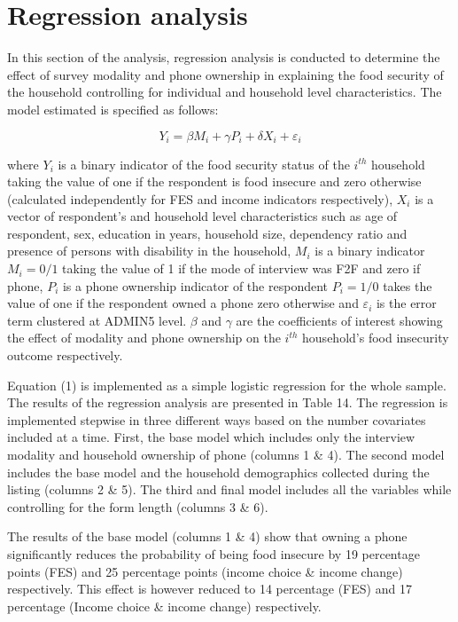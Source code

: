 \documentclass[11pt,harvard]{article}
\begin{document}
\pagebreak

 
\section{Regression analysis}

In this section of the analysis, regression analysis is conducted to determine the effect of survey modality and phone ownership in explaining the food security of the household controlling for individual and household level characteristics. The model estimated is specified as follows:

	\[Y_{i}=\beta M_{i}+ \gamma P_{i}+ \delta X_{i}+ \varepsilon_{i} \tag{1}\] 

where \(Y_{i}\) is a binary indicator of the food security status of the \(i^{th}\) household taking the value of one if the respondent is food insecure
and zero otherwise (calculated independently for FES and income indicators respectively), \(X_{i}\) is a vector of respondent's and household level characteristics such as age of respondent, sex, education in years, household size, dependency ratio and presence of persons with disability in the household, \(M_{i}\) is a binary indicator \(M_{i}=0/1\) taking the value of 1 if the mode of interview was F2F and zero if  phone, \(P_{i}\) is a phone ownership indicator of the respondent \(P_{i}=1/0\) takes the value of one if the respondent owned a phone zero otherwise and \(\varepsilon_{i}\) is the error term clustered at ADMIN5 level. \(\beta\) and \(\gamma\) are the coefficients of interest showing the effect of modality and phone ownership  on the \(i^{th}\) household's food insecurity outcome respectively.

Equation (1) is implemented as a simple logistic regression for the whole sample. The results of the regression analysis are presented in Table 14. The regression is implemented stepwise in three different ways based on the number covariates included at a time. First, the base model which includes only the interview modality and household ownership of phone (columns 1 \& 4). The second model includes the base model and the household demographics collected during the listing (columns 2 \& 5). The third and final model includes all the variables while controlling for the form length (columns 3 \& 6).

The results of the base model (columns 1 \& 4) show that owning a phone significantly reduces the probability of being food insecure by 19 percentage points (FES) and 25 percentage points (income choice \& income change) respectively. This effect is however reduced to 14 percentage (FES) and 17 percentage (Income choice \& income change) respectively. 
\end{document}
